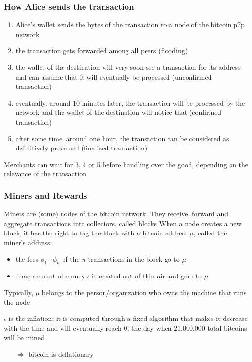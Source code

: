 \documentclass[11pt]{beamer}  %
\begin{document}
\begin{frame}\frametitle{How Alice sends the transaction}

  \begin{enumerate}
  \item Alice's wallet sends the bytes of the transaction to a node of the
    bitcoin p2p network
  \item the transaction gets forwarded among all peers (flooding)
  \item the wallet of the destination will very soon see a transaction
    for its address and can assume that it will eventually be processed
    (\alert{unconfirmed transaction})
  \item eventually, around $10$ minutes later,
    the transaction will be processed by the network and
    the wallet of the destination will notice that (\alert{confirmed transaction})
  \item after some time, around one hour, the transaction can be considered
    as definitively processed (\alert{finalized transaction})
  \end{enumerate}

  Merchants can wait for 3, 4 or 5 before handling over the good,
  depending on the relevance of the transaction

\end{frame}

\begin{frame}\frametitle{Miners and Rewards}

  \begin{greenbox}{Miners are (some) nodes of the bitcoin network. They receive, forward
      and aggregate transactions into collectors, called \alert{blocks}}
    When a node creates a new block, it has the right to tag the block
    with a bitcoin address $\mu$, called the \alert{miner}'s address:
    \begin{itemize}
    \item the fees $\phi_1\cdots\phi_n$ of the $n$ transactions in the block go to $\mu$
    \item some amount of money $\iota$ is created out of thin air and goes to $\mu$
    \end{itemize}
  \end{greenbox}

  \bigskip

  \begin{greenbox}{}
    Typically, $\mu$ belongs to the person/organization who owns the machine that runs the node
  \end{greenbox}

  \bigskip

  \begin{greenbox}{}
    $\iota$ is the \alert{inflation}: it is computed through a fixed algorithm that makes it decrease with the time
    and will eventually reach $0$, the day when 21,000,000 total bitcoins will be mined
    \begin{itemize}
    \item[$\Rightarrow$] bitcoin is deflationary
    \end{itemize}
  \end{greenbox}

\end{frame}
\end{document}
